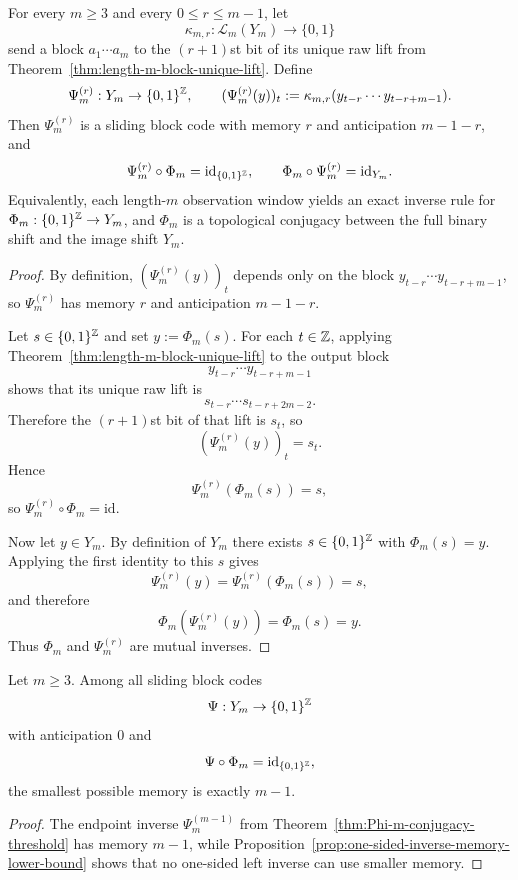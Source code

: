 \begin{theorem}
\label{thm:Phi-m-conjugacy-threshold}
For every $m\ge 3$ and every $0\le r\le m-1$, let
\[
\kappa_{m,r}:\mathcal L_m(Y_m)\to\{0,1\}
\]
send a block $a_1\cdots a_m$ to the $(r+1)$st bit of its unique raw lift from
Theorem~\ref{thm:length-m-block-unique-lift}.  Define
\[
\Psi_m^{(r)}:Y_m\to\{0,1\}^{\mathbb{Z}},
\qquad
(\Psi_m^{(r)}(y))_t:=\kappa_{m,r}(y_{t-r}\cdots y_{t-r+m-1}).
\]
Then $\Psi_m^{(r)}$ is a sliding block code with memory $r$ and anticipation
$m-1-r$, and
\[
\Psi_m^{(r)}\circ\Phi_m=\mathrm{id}_{\{0,1\}^{\mathbb{Z}}},
\qquad
\Phi_m\circ\Psi_m^{(r)}=\mathrm{id}_{Y_m}.
\]
Equivalently, each length-$m$ observation window yields an exact inverse rule
for $\Phi_m:\{0,1\}^{\mathbb{Z}}\to Y_m$, and $\Phi_m$ is a topological conjugacy
between the full binary shift and the image shift $Y_m$.
\end{theorem}

\begin{proof}
By definition, $(\Psi_m^{(r)}(y))_t$ depends only on the block
$y_{t-r}\cdots y_{t-r+m-1}$, so $\Psi_m^{(r)}$ has memory $r$ and anticipation
$m-1-r$.

Let $s\in\{0,1\}^{\mathbb{Z}}$ and set $y:=\Phi_m(s)$.  For each $t\in\mathbb{Z}$, applying
Theorem~\ref{thm:length-m-block-unique-lift} to the output block
\[
y_{t-r}\cdots y_{t-r+m-1}
\]
shows that its unique raw lift is
\[
s_{t-r}\cdots s_{t-r+2m-2}.
\]
Therefore the $(r+1)$st bit of that lift is $s_t$, so
\[
(\Psi_m^{(r)}(y))_t=s_t.
\]
Hence
\[
\Psi_m^{(r)}(\Phi_m(s))=s,
\]
so $\Psi_m^{(r)}\circ\Phi_m=\mathrm{id}$.

Now let $y\in Y_m$.  By definition of $Y_m$ there exists
$s\in\{0,1\}^{\mathbb{Z}}$ with $\Phi_m(s)=y$.  Applying the first identity to this
$s$ gives
\[
\Psi_m^{(r)}(y)=\Psi_m^{(r)}(\Phi_m(s))=s,
\]
and therefore
\[
\Phi_m(\Psi_m^{(r)}(y))=\Phi_m(s)=y.
\]
Thus $\Phi_m$ and $\Psi_m^{(r)}$ are mutual inverses.
\end{proof}

\begin{corollary}
\label{cor:Phi-m-memory-threshold-exact}
Let $m\ge 3$.  Among all sliding block codes
\[
\Psi:Y_m\to\{0,1\}^{\mathbb{Z}}
\]
with anticipation $0$ and
\[
\Psi\circ\Phi_m=\mathrm{id}_{\{0,1\}^{\mathbb{Z}}},
\]
the smallest possible memory is exactly $m-1$.
\end{corollary}

\begin{proof}
The endpoint inverse $\Psi_m^{(m-1)}$ from
Theorem~\ref{thm:Phi-m-conjugacy-threshold} has memory $m-1$, while
Proposition~\ref{prop:one-sided-inverse-memory-lower-bound} shows that no
one-sided left inverse can use smaller memory.
\end{proof}
